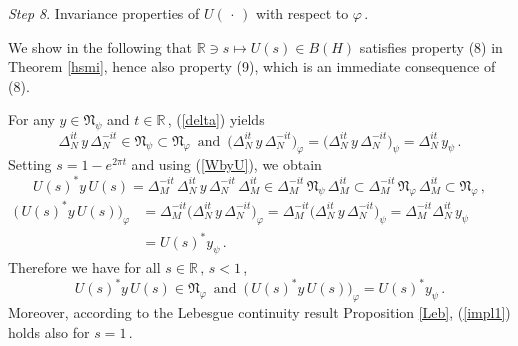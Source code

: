 \documentclass[reqno]{amsart}
\theoremstyle{definition}
\theoremstyle{remark}
\numberwithin{equation}{section}
\theoremstyle{plain}
\begin{document}
{\it Step 8}. {\sc Invariance properties of $U(\,\cdot\, )$ with
respect to $\varphi\,$.}
\medskip

We show in the following that $\mathbb R\ni s\longmapsto U(s)\in B(H)$
satisfies property (8) in Theorem \ref{hsmi}, hence also property
(9), which is an immediate consequence of (8).

For any $y\in\mathfrak N_\psi$ and $t\in\mathbb R\,$, (\ref{delta})
yields
\begin{equation*}
\Delta_N^{it}\, y\,\Delta_N^{-it}\in\mathfrak N_\psi\subset
\mathfrak N_\varphi\,\text{ and }\,\big(\Delta_N^{it}\, y\,
\Delta_N^{-it}\big)_{\!\varphi} =\big(\Delta_N^{it}\, y\,
\Delta_N^{-it}\big)_{\!\psi} =\Delta_N^{it}\, y_\psi\, .
\end{equation*}
Setting $s=1-e^{2 \pi t}$ and using (\ref{WbyU}), we obtain
\begin{equation*}
U(s)^* y\, U(s) =\Delta_M^{-it}\,\Delta_N^{it}\, y\,\Delta_N^{-it}\,
\Delta_M^{it}\in\Delta_M^{-it}\,\mathfrak N_\psi\,\Delta_M^{it}\subset
\Delta_M^{-it}\,\mathfrak N_\varphi\,\Delta_M^{it}\subset
\mathfrak N_\varphi\, ,
\end{equation*}
\begin{align*}
\big(\, U(s)^* y\, U(s)\big)_{\!\varphi} &=\Delta_M^{-it}\big(
\Delta_N^{it}\, y\,\Delta_N^{-it}\big)_{\!\varphi} =\Delta_M^{-it}
\big(\Delta_N^{it}\, y\,\Delta_N^{-it}\big)_{\!\psi} =\Delta_M^{-it}
\Delta_N^{it}\, y_\psi \phantom{xxxxxx} \\ &=U(s)^* y_\psi\, .
\end{align*}
Therefore we have for all $s\in\mathbb R\, ,\, s<1\,$,
\begin{equation}\label{impl1}
U(s)^* y\, U(s)\in\mathfrak N_\varphi\,\text{ and }\,
\big(\, U(s)^* y\, U(s)\big)_{\!\varphi} =U(s)^* y_\psi\, .
\end{equation}
Moreover, according to the Lebesgue continuity result Proposition
\ref{Leb}, (\ref{impl1}) holds also for $s=1\,$.
\end{document}
